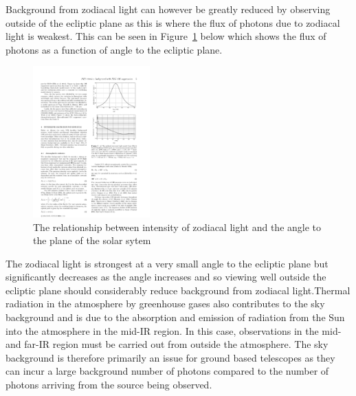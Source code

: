 			Background from zodiacal light can however be greatly reduced by observing outside of the ecliptic plane as this is where the flux of photons due to zodiacal light is weakest. This can be seen in Figure~\ref{fig:air_glow_in_upper_atmosphere_graph} below which shows the flux of photons as a function of angle to the ecliptic plane.
			\begin{figure}[htbp]
				\centering
				\includegraphics[trim = 110mm 198mm 25mm 30mm, clip, width=0.4\textwidth]{../Images/zodiacal_Light_graph.pdf}
				\caption[Zodiacal light vs angle]{The relationship between intensity of zodiacal light and the angle to the plane of the solar sytem}\label{fig:air_glow_in_upper_atmosphere_graph}
			\end{figure}

			The zodiacal light is strongest at a very small angle to the ecliptic plane but significantly decreases as the angle increases and so viewing well outside the ecliptic plane should considerably reduce background from zodiacal light\cite{Zodiacal_Light_over_La_Silla}.Thermal radiation in the atmosphere by greenhouse gases also contributes to the sky background and is due to the absorption and emission of radiation from the Sun into the atmosphere in the mid-IR region. In this case, observations in the mid- and far-IR region must be carried out from outside the atmosphere\cite{Extragalactic_Astronomy_and_Cosmology}. The sky background is therefore primarily an issue for ground based telescopes as they can incur a large background number of photons compared to the number of photons arriving from the source being observed.

